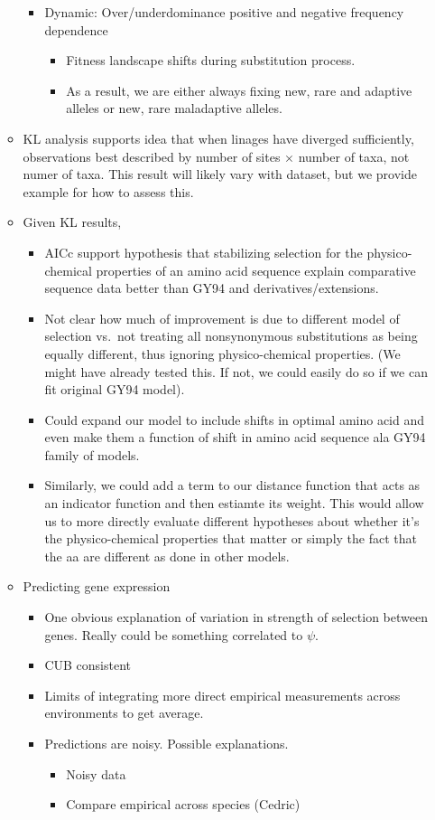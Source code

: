 \documentclass[12pt,letterpaper]{article}
\newcommand{\PC}{physico-chemical\xspace}
\begin{document}
\begin{itemize}
\begin{itemize}
\begin{itemize}
\begin{itemize}
      \end{itemize}
    \item Dynamic: Over/underdominance positive and negative frequency dependence
      \begin{itemize}
      \item Fitness landscape shifts during substitution process.
      \item As a result, we are either always fixing new, rare and adaptive alleles or new, rare maladaptive alleles.
      \end{itemize}
    \end{itemize}
  \item KL analysis supports idea that when linages have diverged sufficiently, observations best described by number of sites $\times$ number of taxa, not numer of taxa.
    This result will likely vary with dataset, but we provide example for how to assess this.
  \item  Given KL results,
    \begin{itemize}
    \item AICc support hypothesis that stabilizing selection for the \PC properties of an amino acid sequence explain comparative sequence data better than GY94 and derivatives/extensions.
    \item Not clear how much of improvement is due to different model of selection vs.~not treating all nonsynonymous substitutions as being equally different, thus ignoring \PC properties.
      (We might have already tested this.  If not, we could easily do so if we can fit original GY94 model).
  \item Could expand our model to include shifts in optimal amino acid and even make them a function of shift in amino acid sequence ala GY94 family of models.
  \item Similarly, we could add a term to our distance function that acts as an indicator function and then estiamte its weight.
    This would allow us to more directly evaluate different hypotheses about whether it's the \PC properties that matter or simply the fact that the aa are different as done in other models.
  \end{itemize}
\item Predicting gene expression
  \begin{itemize}
  \item One obvious explanation of variation in strength of selection between genes.
    Really could be something correlated to $\psi$.
  \item CUB consistent
  \item Limits of integrating more direct empirical measurements across environments to get average.
  \item Predictions are noisy.
    Possible explanations.
    \begin{itemize}
    \item Noisy data
    \item Compare empirical across species (Cedric)
      

\end{itemize}
\end{itemize}
\end{itemize}
\end{itemize}
\end{document}
